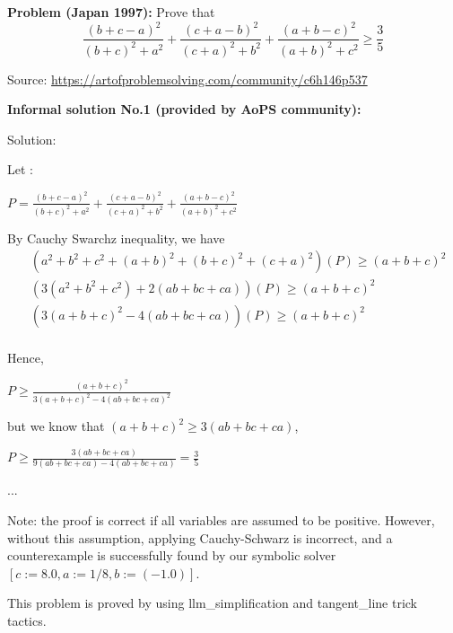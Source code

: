 \begin{tcolorbox} [breakable, enhanced, colback=black!5!white, colframe=black!75!white, title=\name Checks Existing Answers (1)]

\textbf{Problem (Japan 1997):} 
Prove that
\begin{equation*}
\frac{\left(b+c-a\right)^{2}}{\left(b+c\right)^{2}+a^{2}}+\frac{\left(c+a-b\right)^{2}}{\left(c+a\right)^{2}+b^{2}}+\frac{\left(a+b-c\right)^{2}}{\left(a+b\right)^{2}+c^{2}}\geq\frac{3}{5}
\end{equation*}

Source: {\small\url{https://artofproblemsolving.com/community/c6h146p537}}

\tcbline

\textbf{Informal solution No.1 (provided by AoPS community):}

Solution: 

Let :

$ P = \frac {\left(b + c - a\right)^{2}}{\left(b + c\right)^{2} + a^{2}} + \frac {\left(c + a - b\right)^{2}}{\left(c + a\right)^{2} + b^{2}} + \frac {\left(a + b - c\right)^{2}}{\left(a + b\right)^{2} + c^{2}}$

{\color{red} By Cauchy Swarchz inequality, we have
$$
\begin{aligned}
 & (a^2 + b^2 + c^2 + (a + b)^2 + (b + c)^2 + (c + a)^2)(P) \geq (a + b + c)^2 \\
 & (3(a^2 + b^2 + c^2) + 2(ab + bc + ca))(P) \geq (a + b + c)^2 \\
 & (3(a + b + c)^2 - 4(ab + bc + ca))(P) \geq (a + b + c)^2 \\
\end{aligned}
$$
}

Hence, 

$ P \geq \frac {(a + b + c)^2}{3(a + b + c)^2 - 4(ab + bc + ca)^2}$

but we know that $ (a + b + c)^2 \geq 3(ab + bc + ca)$,

$ P\geq \frac {3(ab + bc + ca)}{9(ab + bc + ca) - 4(ab + bc + ca)} = \frac{3}{5}$

...

\vskip 2pt

Note: the proof is correct if all variables are assumed to be positive. However, without this assumption, applying Cauchy-Schwarz is incorrect, and a counterexample is successfully found by our symbolic solver $[c := 8.0, a := 1/8, b := (-1.0)]$.

This problem is proved by \name using llm\_simplification and tangent\_line trick tactics.


\end{tcolorbox}

